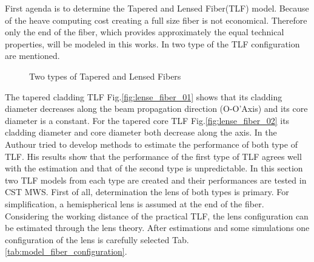 
First agenda is to determine the Tapered and Lensed Fiber(TLF) model. Because of the heave computing cost creating a full size fiber is not economical. Therefore only the end of the fiber, which provides approximately the equal technical properties, will be modeled in this works.  In \cite{TLF_analysis} \cite{TLF_mode_transforming} two type of the TLF configuration are mentioned. 


\begin{figure}[!ht]
\centering
{}
\hfill
{}
\label{fig:two_TLF}
\caption{Two types of Tapered and Lensed Fibers}
\end{figure}

The tapered cladding TLF Fig.\quad\ref{fig:lense_fiber_01} shows that its cladding diameter decreases along the beam propagation direction (O-O'Axis) and its core diameter is a constant. For the tapered core TLF Fig.\quad\ref{fig:lense_fiber_02} its cladding diameter and core diameter both decrease along the axis. In \cite{TLF_mode_transforming} the Authour tried to develop methods to estimate the performance of both type of TLF. His results show that the performance of the first type of TLF agrees well with the estimation and that of the second type is unpredictable. In this section two TLF models from each type are created and their performances are tested in CST MWS.  
First of all, determination the lens of both types is primary. For simplification, a hemispherical lens is assumed at the end of the fiber. Considering the working distance of the practical TLF, the lens configuration can be estimated through the lens theory. After estimations and some simulations one configuration of the lens is carefully selected Tab.\quad\ref{tab:model_fiber_configuration}.   

